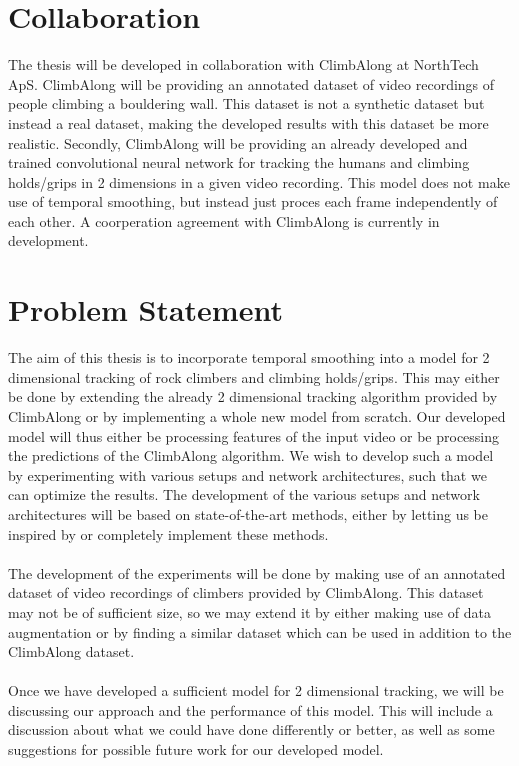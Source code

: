 \documentclass[11pt]{article}
\begin{document}
\section{Collaboration}
\label{sec:collab}
The thesis will be developed in collaboration with ClimbAlong at NorthTech ApS. ClimbAlong will be providing an annotated dataset of video recordings of people climbing a bouldering wall. This dataset is not a synthetic dataset but instead a real dataset, making the developed results with this dataset be more realistic. Secondly, ClimbAlong will be providing an already developed and trained convolutional neural network for tracking the humans and climbing holds/grips in 2 dimensions in a given video recording. This model does not make use of temporal smoothing, but instead just proces each frame independently of each other. A coorperation agreement with ClimbAlong is currently in development.

\section{Problem Statement}
The aim of this thesis is to incorporate temporal smoothing into a model for 2 dimensional tracking of rock climbers and climbing holds/grips. This may either be done by extending the already 2 dimensional tracking algorithm provided by ClimbAlong or by implementing a whole new model from scratch. Our developed model will thus either be processing features of the input video or be processing the predictions of the ClimbAlong algorithm. We wish to develop such a model by experimenting with various setups and network architectures, such that we can optimize the results. The development of the various setups and network architectures will be based on state-of-the-art methods, either by letting us be inspired by or completely implement these methods.
\\
\\
The development of the experiments will be done by making use of an annotated dataset of video recordings of climbers provided by ClimbAlong. This dataset may not be of sufficient size, so we may extend it by either making use of data augmentation or by finding a similar dataset which can be used in addition to the ClimbAlong dataset. 
\\
\\
Once we have developed a sufficient model for 2 dimensional tracking, we will be discussing our approach and the performance of this model. This will include a discussion about what we could have done differently or better, as well as some suggestions for possible future work for our developed model. 
\end{document}
